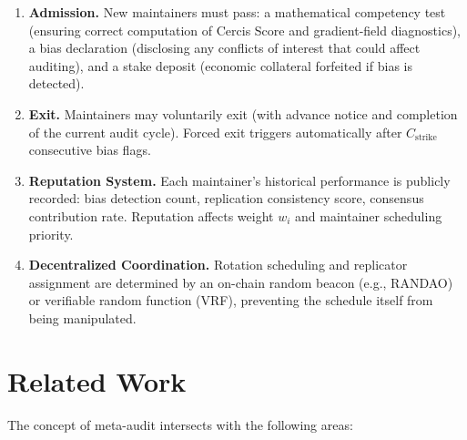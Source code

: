 \documentclass[11pt,a4paper]{article}
\theoremstyle{definition}
\begin{document}
\begin{enumerate}[leftmargin=*, label=\textbf{GOV\arabic*}]
    \item \textbf{Admission.} New maintainers must pass: a mathematical competency test (ensuring correct computation of Cercis Score and gradient-field diagnostics), a bias declaration (disclosing any conflicts of interest that could affect auditing), and a stake deposit (economic collateral forfeited if bias is detected).
    \item \textbf{Exit.} Maintainers may voluntarily exit (with advance notice and completion of the current audit cycle). Forced exit triggers automatically after $C_{\text{strike}}$ consecutive bias flags.
    \item \textbf{Reputation System.} Each maintainer's historical performance is publicly recorded: bias detection count, replication consistency score, consensus contribution rate. Reputation affects weight $w_i$ and maintainer scheduling priority.
    \item \textbf{Decentralized Coordination.} Rotation scheduling and replicator assignment are determined by an on-chain random beacon (e.g., RANDAO) or verifiable random function (VRF), preventing the schedule itself from being manipulated.
\end{enumerate}

\section{Related Work}

\noindent
The concept of meta-audit intersects with the following areas:
\end{document}
